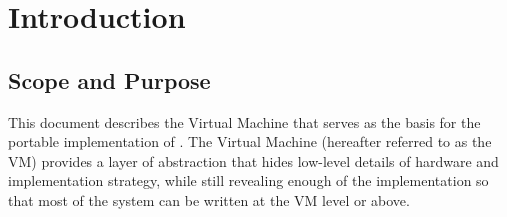 \chapter{Introduction} %



\section{Scope and Purpose}

This document describes the Virtual Machine that serves as the basis for the
portable implementation of \ccl.  The Virtual Machine (hereafter referred to as
the VM) provides a layer of abstraction that hides low-level details of
hardware and implementation strategy, while still revealing enough of the
implementation so that most of the system can be written at the VM level or
above.

